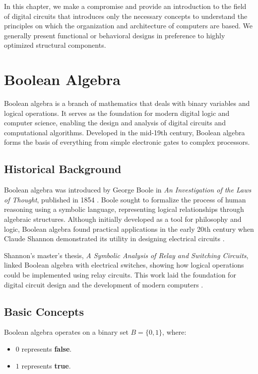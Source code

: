 In this chapter, we make a compromise and provide an introduction to the field of digital circuits that introduces only the necessary concepts to understand the principles on which the organization and architecture of computers are based. We generally present functional or behavioral designs in preference to highly optimized structural components.

\section{Boolean Algebra}
Boolean algebra is a branch of mathematics that deals with binary variables and logical operations. It serves as the foundation for modern digital logic and computer science, enabling the design and analysis of digital circuits and computational algorithms. Developed in the mid-19th century, Boolean algebra forms the basis of everything from simple electronic gates to complex processors.

\subsection{Historical Background}
Boolean algebra was introduced by George Boole in \emph{An Investigation of the Laws of Thought}, published in 1854 \cite{boole1854book}. Boole sought to formalize the process of human reasoning using a symbolic language, representing logical relationships through algebraic structures. Although initially developed as a tool for philosophy and logic, Boolean algebra found practical applications in the early 20th century when Claude Shannon demonstrated its utility in designing electrical circuits \cite{shannon38}.

Shannon's master's thesis, \emph{A Symbolic Analysis of Relay and Switching Circuits}, linked Boolean algebra with electrical switches, showing how logical operations could be implemented using relay circuits. This work laid the foundation for digital circuit design and the development of modern computers \cite{shannon38}.

\subsection{Basic Concepts}
Boolean algebra operates on a binary set \( B = \{0, 1\} \), where:
\begin{itemize}
    \item \( 0 \) represents \textbf{false}.
    \item \( 1 \) represents \textbf{true}.
\end{itemize}

